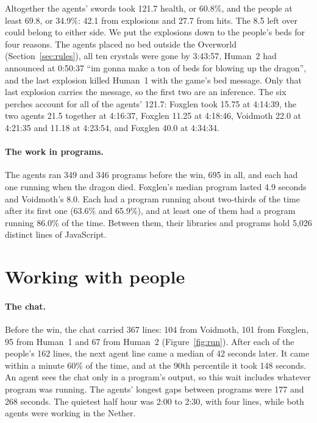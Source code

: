 \documentclass[11pt,a4paper]{article}
\begin{document}
Altogether the agents' swords took 121.7 health, or 60.8\%, and the people at least 69.8, or 34.9\%: 42.1 from explosions and 27.7 from hits. The 8.5 left over could belong to either side. We put the explosions down to the people's beds for four reasons. The agents placed no bed outside the Overworld (Section~\ref{sec:rules}), all ten crystals were gone by 3:43:57, Human~2 had announced at 0:50:37 ``im gonna make a ton of beds for blowing up the dragon'', and the last explosion killed Human~1 with the game's bed message. Only that last explosion carries the message, so the first two are an inference. The six perches account for all of the agents' 121.7: Foxglen took 15.75 at 4:14:39, the two agents 21.5 together at 4:16:37, Foxglen 11.25 at 4:18:46, Voidmoth 22.0 at 4:21:35 and 11.18 at 4:23:54, and Foxglen 40.0 at 4:34:34.

\paragraph{The work in programs.} The agents ran 349 and 346 programs before the win, 695 in all, and each had one running when the dragon died. Foxglen's median program lasted 4.9 seconds and Voidmoth's 8.0. Each had a program running about two-thirds of the time after its first one (63.6\% and 65.9\%), and at least one of them had a program running 86.0\% of the time. Between them, their libraries and programs hold 5,026 distinct lines of JavaScript.

\section{Working with people}
\label{sec:people}

\paragraph{The chat.} Before the win, the chat carried 367 lines: 104 from Voidmoth, 101 from Foxglen, 95 from Human~1 and 67 from Human~2 (Figure~\ref{fig:run}). After each of the people's 162 lines, the next agent line came a median of 42 seconds later. It came within a minute 60\% of the time, and at the 90th percentile it took 148 seconds. An agent sees the chat only in a program's output, so this wait includes whatever program was running. The agents' longest gaps between programs were 177 and 268 seconds. The quietest half hour was 2:00 to 2:30, with four lines, while both agents were working in the Nether.
\end{document}
